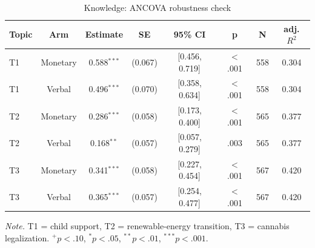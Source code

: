 \begin{table}[htbp]
\centering
\begin{threeparttable}
\caption{Knowledge: ANCOVA robustness check}
\label{tab:tab_knowledge_ancova}
\begin{tabular}{lccccccc}
\toprule
  Topic & Arm & Estimate & SE & 95\% CI & p & N & adj. $R^2$ \\
\midrule
  T1 & Monetary & 0.588$^{***}$ & (0.067) & [0.456, 0.719] & $<$.001 & 558 & 0.304 \\
  T1 & Verbal & 0.496$^{***}$ & (0.070) & [0.358, 0.634] & $<$.001 & 558 & 0.304 \\
  T2 & Monetary & 0.286$^{***}$ & (0.058) & [0.173, 0.400] & $<$.001 & 565 & 0.377 \\
  T2 & Verbal & 0.168$^{**}$ & (0.057) & [0.057, 0.279] & .003 & 565 & 0.377 \\
  T3 & Monetary & 0.341$^{***}$ & (0.058) & [0.227, 0.454] & $<$.001 & 567 & 0.420 \\
  T3 & Verbal & 0.365$^{***}$ & (0.057) & [0.254, 0.477] & $<$.001 & 567 & 0.420 \\
\bottomrule
\end{tabular}
\begin{tablenotes}\footnotesize\item \textit{Note.} T1 = child support, T2 = renewable-energy transition, T3 = cannabis legalization. $^{+}p<.10$, $^{*}p<.05$, $^{**}p<.01$, $^{***}p<.001$.\end{tablenotes}
\end{threeparttable}
\end{table}

